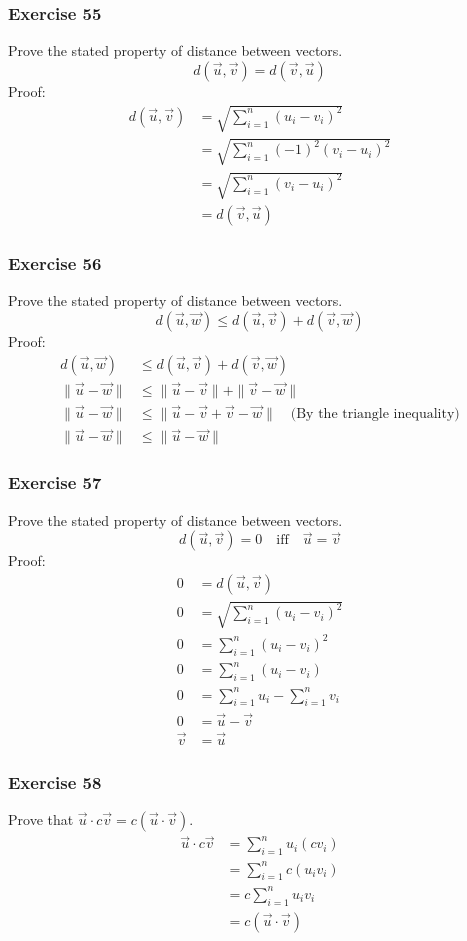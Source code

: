 \documentclass{math}
\begin{document}
\subsubsection*{Exercise 55}
Prove the stated property of distance between vectors.
\[ d(\vec{u},\vec{v}) = d(\vec{v},\vec{u}) \]
Proof:
\begin{align*}
  d(\vec{u},\vec{v}) &= \sqrt{\sum_{i=1}^{n}(u_i-v_i)^2} \\
  &= \sqrt{\sum_{i=1}^{n}(-1)^2(v_i-u_i)^2} \\
  &= \sqrt{\sum_{i=1}^{n}(v_i-u_i)^2} \\
  &= d(\vec{v},\vec{u})
\end{align*}

\subsubsection*{Exercise 56}
Prove the stated property of distance between vectors.
\[ d(\vec{u},\vec{w}) \le d(\vec{u},\vec{v})+d(\vec{v},\vec{w}) \]
Proof:
\begin{align*}
  d(\vec{u},\vec{w}) &\le d(\vec{u},\vec{v})+d(\vec{v},\vec{w}) \\
  \|\vec{u}-\vec{w}\| &\le \|\vec{u}-\vec{v}\|+\|\vec{v}-\vec{w}\| \\
  \|\vec{u}-\vec{w}\| &\le \|\vec{u}-\vec{v}+\vec{v}-\vec{w}\|
    \quad\text{(By the triangle inequality)} \\
  \|\vec{u}-\vec{w}\| &\le \|\vec{u}-\vec{w}\|
\end{align*}

\subsubsection*{Exercise 57}
Prove the stated property of distance between vectors.
\[ d(\vec{u},\vec{v}) = 0 \quad\text{iff}\quad \vec{u} = \vec{v} \]
Proof:
\begin{align*}
  0 &= d(\vec{u},\vec{v}) \\
  0 &= \sqrt{\sum_{i=1}^{n}(u_i-v_i)^2} \\
  0 &= \sum_{i=1}^{n}(u_i-v_i)^2 \\
  0 &= \sum_{i=1}^{n}(u_i-v_i) \\
  0 &= \sum_{i=1}^{n}u_i-\sum_{i=1}^{n}v_i \\
  0 &= \vec{u}-\vec{v} \\
  \vec{v} &= \vec{u}
\end{align*}

\subsubsection*{Exercise 58}
Prove that \( \vec{u}\cdot c\vec{v} = c(\vec{u}\cdot\vec{v}) \).
\begin{align*}
  \vec{u}\cdot c\vec{v} &= \sum_{i=1}^{n}u_{i}(cv_{i}) \\
  &= \sum_{i=1}^{n}c(u_{i}v_{i}) \\
  &= c\sum_{i=1}^{n}u_{i}v_{i} \\
  &= c(\vec{u}\cdot\vec{v})
\end{align*}
\end{document}
